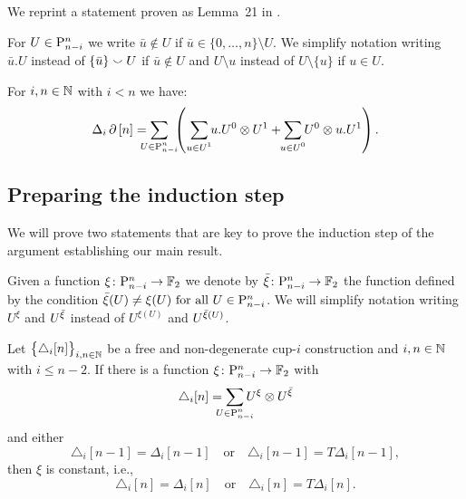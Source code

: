 We reprint a statement proven as Lemma~21 in \cite{medina2021fast_sq}.

\begin{notation*}
	For $U \in \P_{n-i}^n$ we write $\bar u \notin U$ if $\bar u \in \{0, \dots, n\} \setminus U$.
	We simplify notation writing $\bar u.U$ instead of $\{\bar u\} \union U$ if $\bar u \notin U$ and $U \setminus u$ instead of $U \setminus \{u\}$ if $u \in U$.
\end{notation*}

\begin{proposition} \label{p:fact}
	For $i,n \in \N$ with $i < n$ we have:
	\[
	\Delta_i \bd \, [n] =
	\sum_{\mathclap{U \in \P_{n-i}^n}} \
	\left(\
	\sum_{\mathclap{u \in U^1}} u.U^0 \ot U^1 +
	\sum_{\mathclap{u \in U^0}} U^0 \ot u.U^1
	\right).
	\]
\end{proposition}

\subsection{Preparing the induction step} \label{ss:preparing}

We will prove two statements that are key to prove the induction step of the argument establishing our main result.

\begin{notation*}
	Given a function $\xi \colon \P_{n-i}^n \to \F$ we denote by $\barxi \colon \P_{n-i}^n \to \F$ the function defined by the condition $\barxi(U) \neq \xi(U) \text{ for all } U \in \P_{n-i}^n$.
	We will simplify notation writing $U^\xi$ and $U^{\barxi}$ instead of $U^{\xi(U)}$ and $U^{\barxi(U)}$.
\end{notation*}

\begin{lemma} \label{l:first nail}
	Let $\big\{ \triangle_i [n] \big\}_{i,n\in\N}$ be a free and non-degenerate \mbox{cup-$i$} construction and $i,n \in \N$ with $i \leq n-2$.
	If there is a function $\xi \colon \P_{n-i}^n \to \F$ with
	\begin{equation} \label{e:xi and barxi}
	\triangle_i [n] =
	\sum_{\mathclap{U \in \P_{n-i}^n}} U^{\xi} \ot U^{\barxi}
	\end{equation}
	and either
	\[
	\triangle_i [n-1] = \Delta_i [n-1]
	\quad \text{or} \quad
	\triangle_i [n-1] = T\Delta_i [n-1],
	\]
	then $\xi$ is constant, i.e.,
	\[
	\triangle_i [n] = \Delta_i [n]
	\quad \text{or} \quad
	\triangle_i [n] = T \Delta_i [n].
	\]
\end{lemma}


